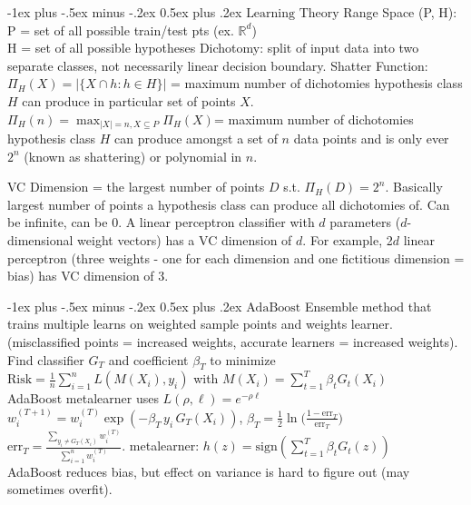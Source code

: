 \documentclass[10pt,landscape]{article}
\makeatletter
\renewcommand{\section}{\@startsection{section}{1}{0mm}%
                                {-1ex plus -.5ex minus -.2ex}%
                                {0.5ex plus .2ex}%
                                {\normalfont\large\bfseries}}
\makeatother
\begin{document}
\begin{multicols}{3}
\section{$\boxed{\text{Learning Theory}}$}
Range Space (P, H):
P = set of all possible train/test pts (ex. $\mathbb R^d$)
\\
H = set of all possible hypotheses
Dichotomy: split of input data into two separate classes, not necessarily linear decision boundary. 
Shatter Function: $\Pi_H(X)=|\{X\cap h:h\in H\}|$ = maximum number of dichotomies hypothesis class $H$ can produce in particular set of points $X$.
$\displaystyle\Pi_{H}(n)=\max _{|X|=n, X \subseteq P} \Pi_{H}(X)$= maximum number of dichotomies hypothesis class $H$ can produce amongst a set of $n$ data points and is only ever $2^n$ (known as shattering) or polynomial in $n$.

VC Dimension = the largest number of points $D$ s.t. $\Pi_H(D) = 2^n$. Basically largest number of points a hypothesis class can produce all dichotomies of. Can be infinite, can be $0$.
A linear perceptron classifier with $d$ parameters ($d$-dimensional weight vectors) has a VC dimension of $d$. For example, 2$d$ linear perceptron (three weights - one for each dimension and one fictitious dimension = bias) has VC dimension of 3.

\section{$\boxed{\text{AdaBoost}}$}
Ensemble method that trains multiple learns on weighted sample points and weights learner. (misclassified points = increased weights, accurate learners = increased weights). Find classifier $G_T$ and coefficient $\beta_T$ to minimize\\
$\text{Risk} = \frac{1}{n} \sum_{i=1}^n L(M(X_i), y_i)$ with $M(X_i) = \sum_{t=1}^T \beta_t G_t(X_i)$\\ 
AdaBoost metalearner uses $L(\rho, \ell) = e^{-\rho \ell}$
$w_i^{(T + 1)} = w_i^{(T)} \exp(-\beta_T \, y_i \, G_T(X_i))$, $\beta_T = \frac{1}{2}\ln \bigg(\frac{1 - \mathrm{err}_T}{\mathrm{err}_T}\bigg)$
$\mathrm{err}_T = \frac{\sum_{y_i \neq G_T(X_i)}w_i^{(T)}}{\sum_{i = 1}^n w_i^{(T)}}.$ metalearner: $h(z) = \mathrm{sign}(\sum_{t=1}^T \beta_t G_t(z))$\\
AdaBoost reduces bias, but effect on variance is hard to figure out (may sometimes overfit).

\end{multicols}
\end{document}
